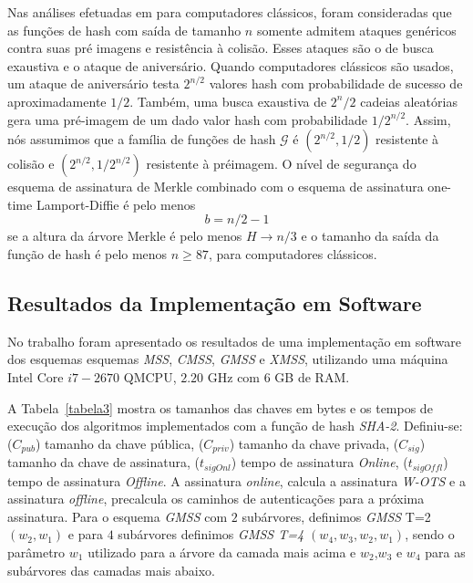 \documentclass{SBCbookchapter}
\begin{document}
\begin{otherlanguage}{brazilian}
Nas análises efetuadas em \cite{bernst:09} para computadores clássicos, foram consideradas que as funções de hash com saída de tamanho $n$ somente admitem ataques genéricos contra suas pré imagens e resistência à colisão. 
Esses ataques são o de busca exaustiva e o ataque de aniversário. 
Quando computadores clássicos são usados, um ataque de aniversário testa $2^{n/2}$ valores hash com probabilidade de sucesso de aproximadamente $1/2$. 
Também, uma busca exaustiva de $2^n/2$ cadeias aleatórias gera uma pré-imagem de um dado valor hash com probabilidade $1/2^{n/2}$. 
Assim, nós assumimos que a família de funções de hash $\mathcal{G}$ é $(2^{n/2},1/2)$ resistente à colisão e $(2^{n/2}, 1/2^{n/2})$ resistente à préimagem.
O nível de segurança do esquema de assinatura de Merkle combinado com o esquema de assinatura one-time Lamport-Diffie é pelo menos
$$b = n/2 -1$$
se a altura da árvore Merkle é pelo menos $H\rightarrow n/3$ e o tamanho da saída da função de hash é pelo menos $n\geqslant 87$, para computadores clássicos.

\subsection{Resultados da Implementação em Software}

No trabalho\cite{ana:13} foram apresentado os resultados de uma implementação em software dos esquemas esquemas \textit{MSS}, \textit{CMSS}, \textit{GMSS} e \textit{XMSS},
utilizando uma máquina Intel Core $i7-2670$ QMCPU, $2.20$ GHz com $6$ GB de RAM.

A Tabela~\ref{tabela3} mostra os tamanhos das chaves em bytes e os tempos de execução dos algoritmos implementados com a função de hash \textit{SHA-2}. 
Definiu-se: ($C_{pub}$) tamanho da chave pública, ($C_{priv}$) tamanho da chave privada, ($C_{sig}$) tamanho da chave de assinatura, ($t_{sigOnl}$) tempo de assinatura \textit{Online}, ($t_{sigOffl}$) tempo de assinatura \textit{Offline}.
A assinatura \textit{online}, calcula a assinatura \textit{W-OTS} e a assinatura \textit{offline}, precalcula os ca\-minhos de autenticações para a próxima assinatura. 
Para o esquema \textit{GMSS} com $2$ subárvores, definimos \textit{GMSS} T=2 $(w_2,w_1)$ e para $4$ subárvores definimos \textit{GMSS T=4 $(w_4,w_3,w_2,w_1)$}, sendo
o parâmetro $w_1$ utilizado para a árvore da camada mais acima e $w_2$,$w_3$ e $w_4$ para as subárvores das camadas mais abaixo.


\end{otherlanguage}
\end{document}
